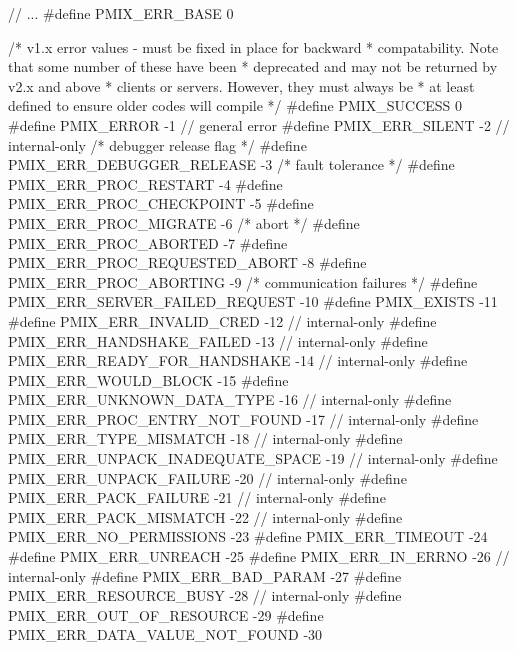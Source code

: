\cspecificstart
\begin{codepar}
// ...
#define PMIX_ERR_BASE                   0

/* v1.x error values - must be fixed in place for backward
 * compatability. Note that some number of these have been
 * deprecated and may not be returned by v2.x and above
 * clients or servers. However, they must always be
 * at least defined to ensure older codes will compile */
#define PMIX_SUCCESS                                 0
#define PMIX_ERROR                                  -1          // general error
#define PMIX_ERR_SILENT                             -2          // internal-only
/* debugger release flag */
#define PMIX_ERR_DEBUGGER_RELEASE                   -3
/* fault tolerance */
#define PMIX_ERR_PROC_RESTART                       -4
#define PMIX_ERR_PROC_CHECKPOINT                    -5
#define PMIX_ERR_PROC_MIGRATE                       -6
/* abort */
#define PMIX_ERR_PROC_ABORTED                       -7
#define PMIX_ERR_PROC_REQUESTED_ABORT               -8
#define PMIX_ERR_PROC_ABORTING                      -9
/* communication failures */
#define PMIX_ERR_SERVER_FAILED_REQUEST              -10
#define PMIX_EXISTS                                 -11
#define PMIX_ERR_INVALID_CRED                       -12         // internal-only
#define PMIX_ERR_HANDSHAKE_FAILED                   -13         // internal-only
#define PMIX_ERR_READY_FOR_HANDSHAKE                -14         // internal-only
#define PMIX_ERR_WOULD_BLOCK                        -15
#define PMIX_ERR_UNKNOWN_DATA_TYPE                  -16         // internal-only
#define PMIX_ERR_PROC_ENTRY_NOT_FOUND               -17         // internal-only
#define PMIX_ERR_TYPE_MISMATCH                      -18         // internal-only
#define PMIX_ERR_UNPACK_INADEQUATE_SPACE            -19         // internal-only
#define PMIX_ERR_UNPACK_FAILURE                     -20         // internal-only
#define PMIX_ERR_PACK_FAILURE                       -21         // internal-only
#define PMIX_ERR_PACK_MISMATCH                      -22         // internal-only
#define PMIX_ERR_NO_PERMISSIONS                     -23
#define PMIX_ERR_TIMEOUT                            -24
#define PMIX_ERR_UNREACH                            -25
#define PMIX_ERR_IN_ERRNO                           -26         // internal-only
#define PMIX_ERR_BAD_PARAM                          -27
#define PMIX_ERR_RESOURCE_BUSY                      -28         // internal-only
#define PMIX_ERR_OUT_OF_RESOURCE                    -29
#define PMIX_ERR_DATA_VALUE_NOT_FOUND               -30

\end{codepar}
